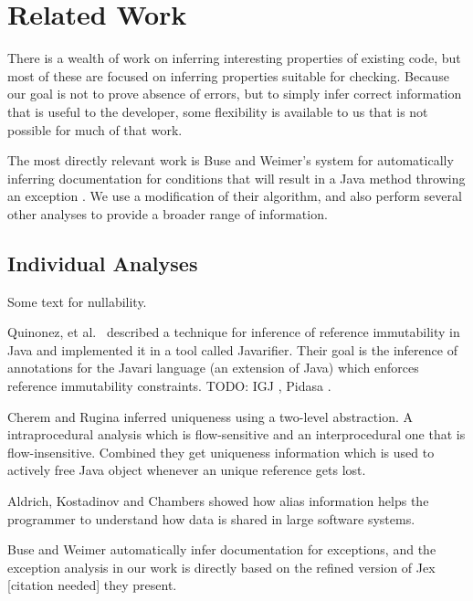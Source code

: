 \section{Related Work}
There is a wealth of work on inferring interesting properties of existing code,
but most of these are focused on inferring properties suitable for checking.
Because our goal is not to prove absence of errors, but to simply infer correct
information that is useful to the developer, some flexibility is available to us
that is not possible for much of that work.

The most directly relevant work is Buse and Weimer's system for automatically
inferring documentation for conditions that will result in a Java method
throwing an exception \cite{autodoc}.  We use a modification of their
algorithm, and also perform several other analyses to provide a broader range
of information.

\subsection{Individual Analyses}
Some text for nullability.

Quinonez, et al.\ \cite{Javarifier} described a technique for inference of
reference immutability in Java and implemented it in a tool called {\sc
  Javarifier}. Their goal is the inference of annotations for the {\sc Javari}
language (an extension of Java) which enforces reference immutability
constraints. TODO: IGJ \cite{IGJ}, Pidasa \cite{Pidasa}.

Cherem and Rugina \cite{UniquenessInference} inferred uniqueness using a two-level
abstraction. A intraprocedural analysis which is flow-sensitive and an interprocedural
one that is flow-insensitive. Combined they get uniqueness information
which is used to actively free Java object whenever an unique reference gets lost.

Aldrich, Kostadinov and Chambers \cite{AliasJava} showed how alias information 
helps the programmer to understand how data is shared in large software systems.

Buse and Weimer \cite{autodoc} automatically infer documentation for
exceptions, and the exception analysis in our work is directly based on the
refined version of {\sc Jex} [citation needed] they present.

